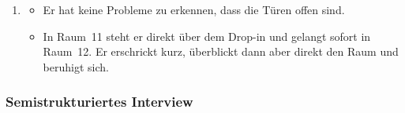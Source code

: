 \documentclass[../Main.tex]{subfiles}
\begin{document}
\begin{enumerate}[label=\textbf{B\arabic*}, leftmargin=1.5cm, itemsep=0.8em, resume]
\begin{itemize}[nosep]
\item Er versucht, die Gegner-KI zu durchschauen.
\item Er sucht nach interaktiven Objekten; es gibt aber keine.
\item Er wechselt zwischen Heavy und Light Attack ab.
\item Er versucht, die Gegner von seinem High Ground aus auszutricksen, was aber nicht funktioniert.
\item Er bemerkt, dass die Angriffe unterschiedlich viel Schaden machen und dass zwei Heavy Attacks einen Archer direkt besiegen.
\item Er ist die ganze Zeit eher damit beschäftigt, das Spiel zu beobachten und Muster sowie Bugs zu finden.
\end{itemize}
\item
\begin{itemize}[nosep]
\item Er hat keine Probleme zu erkennen, dass die Türen offen sind.
\item In Raum~11 steht er direkt über dem Drop-in und gelangt sofort in Raum~12. Er erschrickt kurz, überblickt dann aber direkt den Raum und beruhigt sich.
\end{itemize}
\end{enumerate}

\subsubsection{Semistrukturiertes Interview}
\end{document}
